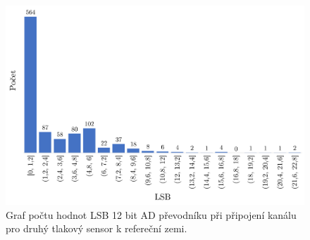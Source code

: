 \begin{figure}[H]
    \caption{Graf počtu hodnot LSB 12 bit AD převodníku při připojení kanálu pro druhý tlakový sensor k refereční zemi.}
    \label{fig:hist_vacuum2_gnd}
    \includegraphics[width=1\textwidth]{graphs/vacuum2_gnd.png}

\end{figure}


